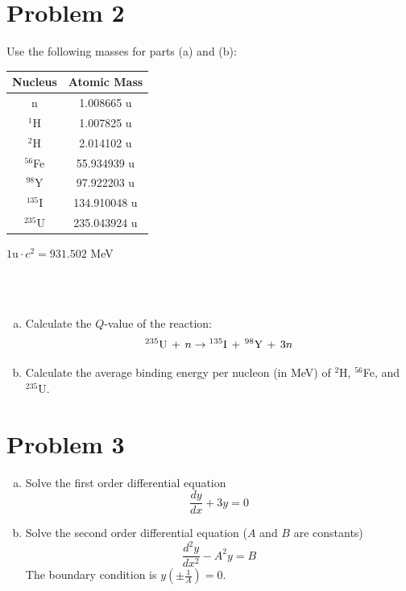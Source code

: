 \documentclass{report}
\begin{document}
\newpage
\section*{Problem 2}

Use the following masses for parts (a) and (b):

\begin{table}[htbp]
	\centering
	\begin{tabular}{|c|c|}
			\hline
			Nucleus		&	Atomic Mass \\
			\hline
			n 			&	 1.008665 u \\
			$^{1}$H		& 	 1.007825 u \\
			$^{2}$H 	&	 2.014102 u \\
			$^{56}$Fe	&   55.934939 u \\
			$^{98}$Y 	&   97.922203 u \\
			$^{135}$I	&  134.910048 u \\
			$^{235}$U	&  235.043924 u \\
			\hline
	\end{tabular}
	\label{tab:design-specs}
\end{table}
\begin{center}$1\text{u} \cdot c^{2} = 931.502$ MeV\end{center}
\-\\
\-\\
\begin{enumerate}[a)]
\item Calculate the $Q$-value of the reaction:
$$ ^{235}\text{U}\, + \,n \-\rightarrow\- ^{135}\text{I}\, + \,^{98}\text{Y}\, + \,3n $$
\item Calculate the average binding energy per nucleon (in MeV) of $^{2}$H, $^{56}$Fe, and $^{235}$U.

\end{enumerate}



\newpage
\section*{Problem 3}

\begin{enumerate}[a)]
\item Solve the first order differential equation
$$ \frac{dy}{dx} + 3y = 0 $$
\item Solve the second order differential equation ($A$ and $B$ are constants)
$$ \frac{d^2 y}{dx^2} - A^2y = B $$
The boundary condition is $y(\pm\frac{1}{A}) = 0$.
\end{enumerate}
\end{document}
